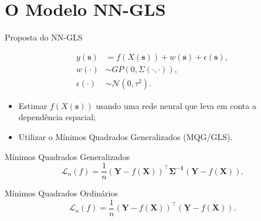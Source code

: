 \documentclass{beamer}
\begin{document}
    \section{O Modelo NN-GLS}

\begin{frame}{Proposta do NN-GLS}

\begin{equation*}
\begin{aligned}
y(\mathbf{s}) &= f\!\left(X(\mathbf{s})\right)
              + w(\mathbf{s})
              + \epsilon(\mathbf{s}), \\
w(\cdot) &\sim GP\!\left(0,\Sigma(\cdot,\cdot)\right), \\
\epsilon(\cdot) &\sim \mathcal{N}(0, \tau^2).
\end{aligned}
\end{equation*}

\begin{itemize}
    \item Estimar $f(X(\mathbf{s}))$ usando uma rede neural que leva em conta a dependência espacial;
    \item Utilizar o Mínimos Quadrados Generalizados (MQG/GLS).
\end{itemize}

\begin{block}{Mínimos Quadrados Generalizados}
\[
\mathcal{L}_n(f)=
\frac{1}{n}
(\mathbf{Y}-f(\mathbf{X}))^\top
\boldsymbol{\Sigma ^{-1}}
(\mathbf{Y}-f(\mathbf{X})).
\]
\end{block}

\begin{block}{Mínimos Quadrados Ordinários}
\[
\mathcal{L}_n(f) = 
\frac{1}{n}
(\mathbf{Y}-f(\mathbf{X}))^\top 
(\mathbf{Y}-f(\mathbf{X})).
\]
\end{block}
\end{frame}
\end{document}
